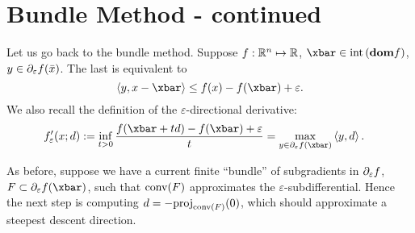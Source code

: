 \section{Bundle Method - continued}

Let us go back to the bundle method. Suppose $f: \mathbb{R}^n \mapsto \mathbb{R}$, $\xbar
\in \intr{\dom f}$, $y \in \partial_{\varepsilon} f(\bar{x})$. The last is equivalent to
\[
	\ip{y, x - \xbar} \leq f(x) - f(\xbar) + \varepsilon.
\]
We also recall the definition of the $\varepsilon$-directional derivative:
\begin{align*}
	f'_{\varepsilon}(x; d) & := \inf_{t > 0} \frac{f(\xbar + td) - f(\xbar) +
	\varepsilon}{t} = \max_{y \in \epsdiff f(\xbar)} \ip{y, d}.
\end{align*}

As before, suppose we have a current finite ``bundle'' of subgradients in
$\partial_{\varepsilon} f$, $F \subset \epsdiff f(\xbar)$, such that $\mathrm{conv}(F)$
approximates the $\varepsilon$-subdifferential. Hence the next step is
computing $d = -\mathrm{proj}_{\mathrm{conv}(F)}(0)$, which should approximate a steepest
descent direction.


